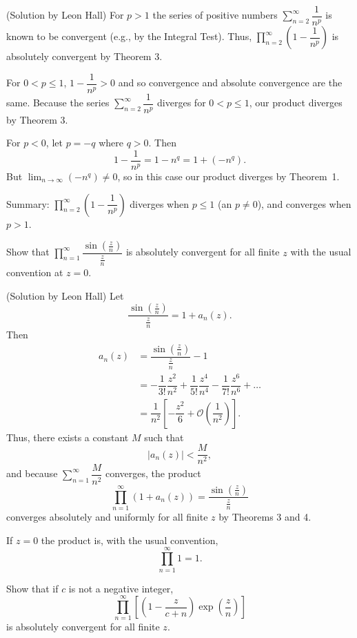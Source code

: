 \begin{solution}(Solution by Leon Hall)
For $p>1$ the series of positive numbers $\displaystyle\sum_{n=2}^{\infty} \dfrac{1}{n^p}$ is known to be convergent (e.g., by the Integral Test). Thus, $\displaystyle\prod_{n=2}^{\infty} \left( 1 - \dfrac{1}{n^p} \right)$ is absolutely convergent by Theorem 3.

For $0 < p \leq 1$, $1 - \dfrac{1}{n^p} > 0$ and so convergence and absolute convergence are the same. Because the series $\displaystyle\sum_{n=2}^{\infty} \dfrac{1}{n^p}$ diverges for $0 < p \leq 1$, our product diverges by Theorem 3.

For $p < 0$, let $p = -q$ where $q > 0$. Then
$$1 - \dfrac{1}{n^p} = 1 - n^q = 1 + (-n^q).$$
But $\displaystyle\lim_{n \rightarrow \infty} (-n^q) \neq 0$, so in this case our product diverges by Theorem~1. 

Summary: $\displaystyle\prod_{n=2}^{\infty} \left( 1 - \dfrac{1}{n^p} \right)$ diverges when $p \leq 1$ (an $p \neq 0$), and converges when $p > 1$.
\end{solution}
\begin{problem}\label{problem10chapter1}
Show that $\displaystyle\prod_{n=1}^{\infty} \dfrac{\sin ( \frac{z}{n})}{\frac{z}{n}}$ is absolutely convergent for all finite $z$ with the usual convention at $z=0$.
\end{problem}
\begin{solution}(Solution by Leon Hall)
Let
$$\dfrac{\sin(\frac{z}{n})}{\frac{z}{n}} = 1 + a_n(z).$$
Then
$$\begin{array}{ll}
a_n(z) &= \dfrac{\sin(\frac{z}{n})}{\frac{z}{n}} - 1 \\
&= -\dfrac{1}{3!} \dfrac{z^2}{n^2} + \dfrac{1}{5!} \dfrac{z^4}{n^4} - \dfrac{1}{7!} \dfrac{z^6}{n^6} + \ldots \\
&= \dfrac{1}{n^2} \left[ -\dfrac{z^2}{6} + \mathcal{O} \left( \dfrac{1}{n^2} \right) \right].
\end{array}$$
Thus, there exists a constant $M$ such that
$$|a_n(z)| < \dfrac{M}{n^2},$$
and because $\displaystyle\sum_{n=1}^{\infty} \dfrac{M}{n^2}$ converges, the product
$$\displaystyle\prod_{n=1}^{\infty} (1+a_n(z)) = \dfrac{\sin(\frac{z}{n})}{\frac{z}{n}}$$
converges absolutely and uniformly for all finite $z$ by Theorems 3 and 4. 

If $z=0$ the product is, with the usual convention,
$$\displaystyle\prod_{n=1}^{\infty} 1 = 1.$$
\end{solution}
\begin{problem}\label{problem11chapter1}
Show that if $c$ is not a negative integer,
$$\displaystyle\prod_{n=1}^{\infty} \left[ \left( 1 - \dfrac{z}{c+n} \right) \exp \left( \dfrac{z}{n} \right) \right]$$
is absolutely convergent for all finite $z$.
\end{problem}
